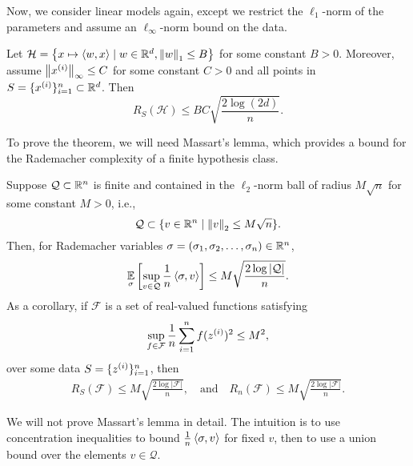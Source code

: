Now, we consider linear models again, except we restrict the $\ell_1$-norm of the parameters and assume an $\ell_\infty$-norm bound on the data.

\begin{theorem}\label{lec7:thm:l1-thm}
    Let $\mathcal{H} = \cbr{x \mapsto \inprod{w,x} \mid w \in \R^d, \Norm{w}_1 \le B}$ for some constant $B > 0$. Moreover, assume $\Norm{x\sp{i}}_\infty \leq C$ for some constant $C > 0$ and all points in $S = \{x\sp{i}\}_{i=1}^n \subset \R^d$. Then
    \begin{equation}
        R_S(\mathcal{H}) \leq BC\sqrt{\frac{2\log(2d)}{n}}.
    \end{equation}
\end{theorem}

To prove the theorem, we will need Massart's lemma, which provides a bound for the Rademacher complexity of a finite hypothesis class.

    \begin{lemma}
        Suppose $\mathcal{Q} \subset \R^n$ is finite and contained in the $\ell_2$-norm ball of radius $M\sqrt{n}$ for some constant $M > 0$, i.e.,
        \begin{equation}
            \mathcal{Q} \subset \{v \in \R^n \mid \Norm{v}_2 \leq M\sqrt{n} \}.
        \end{equation}
        Then, for Rademacher variables $\sigma = (\sigma_1,\sigma_2,\dots,\sigma_n) \in \R^n$,
        \begin{equation}
            \Exp_\sigma \left[ \sup_{v\in \mathcal{Q}} \frac{1}{n}\inprod{\sigma,v} \right] \leq M\sqrt{\frac{2\log|\mathcal{Q}|}{n}}.
        \end{equation}
        As a corollary, if $\mathcal{F}$ is a set of real-valued functions satisfying
        \begin{equation}
            \sup_{f\in\mathcal{F}} \frac{1}{n}\sum_{i=1}^n f(z\sp{i})^2 \leq M^2,
        \end{equation}
        over some data $S = \{z\sp{i}\}_{i=1}^n$, then
        \begin{align}
            R_S(\mathcal{F}) \leq M\sqrt{\frac{2\log|\mathcal{F}|}{n}}, \quad\text{and}\quad
            R_n(\mathcal{F}) \leq M\sqrt{\frac{2\log|\mathcal{F}|}{n}}.
        \end{align}
    \end{lemma}

We will not prove Massart's lemma in detail. The intuition is to use concentration inequalities to bound $\frac{1}{n}\inprod{\sigma, v}$ for fixed $v$, then to use a union bound over the elements $v \in \mathcal{Q}$.

